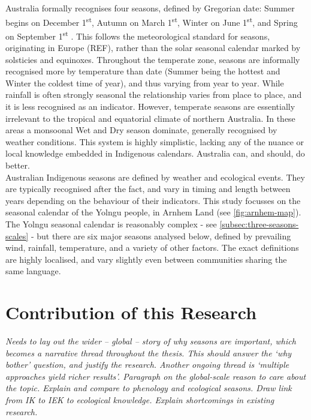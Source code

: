 Australia formally recognises four seasons, defined by Gregorian date:
Summer begins on December 1\textsuperscript{st}, Autumn on March
1\textsuperscript{st}, Winter on June 1\textsuperscript{st}, and Spring
on September 1\textsuperscript{st} \citep{wells2013}. This follows the
meteorological standard for seasons, originating in Europe (REF), rather
than the solar seasonal calendar marked by solsticies and equinoxes.
%
Throughout the temperate zone, seasons are informally recognised more by
temperature than date (Summer being the hottest and Winter the coldest time
of year), and thus varying from year to year.  While rainfall is often
strongly  seasonal the relationship varies from place to place, and it is
less recognised as an indicator.
%
However, temperate seasons are essentially irrelevant to the tropical and
equatorial climate of northern Australia.  In these areas a monsoonal Wet
and Dry season dominate, generally recognised by weather conditions.
This system is highly simplistic, lacking any of the nuance or local
knowledge embedded in Indigenous calendars.  Australia can, and should,
do better.\\


Australian Indigenous seasons are defined by weather and ecological events.
They are typically recognised after the fact, and vary in timing and length
between years depending on the behaviour of their indicators.  This study
focusses on the seasonal calendar of the Yolngu people, in Arnhem Land (see
\autoref{fig:arnhem-map}).
%
The Yolngu seasonal calendar is reasonably complex - see
\autoref{subsec:three-seasons-scales} - but there are six major seasons
analysed below, defined by prevailing wind, rainfall, temperature, and a
variety of other factors.  The exact definitions are highly localised,
and vary slightly even between communities sharing the same language.




\section{Contribution of this Research}
\label{sec:intro-contribution}


\textit{
Needs to lay out the wider -- global -- story of why seasons are important,
which becomes a narrative thread throughout the thesis.
This should answer the `why bother' question, and justify the research.
Another ongoing thread is `multiple approaches yield richer results'.
%
Paragraph on the global-scale reason to care about the topic.
Explain and compare to phenology and ecological seasons.
Draw link from IK to IEK to ecological knowledge.
Explain shortcomings in existing research.
}
~\\



